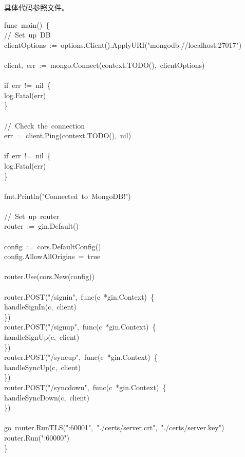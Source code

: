\documentclass{article}
\begin{document}
具体代码参照文件。%
\begin{mdpre}%
\noindent func~main()~\{\\
//~Set~up~DB\\
clientOptions~:=~options.Client().ApplyURI("mongodb://localhost:27017")\\
\\
client,~err~:=~mongo.Connect(context.TODO(),~clientOptions)\\
\\
if~err~!=~nil~\{\\
log.Fatal(err)\\
\}\\
\\
//~Check~the~connection\\
err~=~client.Ping(context.TODO(),~nil)\\
\\
if~err~!=~nil~\{\\
log.Fatal(err)\\
\}\\
\\
fmt.Println("Connected~to~MongoDB!")\\
\\
//~Set~up~router\\
router~:=~gin.Default()\\
\\
config~:=~cors.DefaultConfig()\\
config.AllowAllOrigins~=~true\\
\\
router.Use(cors.New(config))\\
\\
router.POST("/signin",~func(c~*gin.Context)~\{\\
handleSignIn(c,~client)\\
\})\\
router.POST("/signup",~func(c~*gin.Context)~\{\\
handleSignUp(c,~client)\\
\})\\
router.POST("/syncup",~func(c~*gin.Context)~\{\\
handleSyncUp(c,~client)\\
\})\\
router.POST("/syncdown",~func(c~*gin.Context)~\{\\
handleSyncDown(c,~client)\\
\})\\
\\
go~router.RunTLS(":60001",~"./certs/server.crt",~"./certs/server.key")\\
router.Run(":60000")\\
\}%
\end{mdpre}
\end{document}
